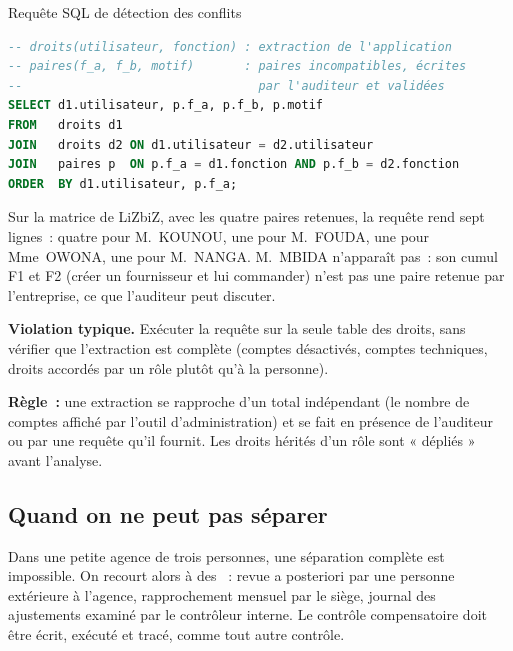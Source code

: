 \begin{boxoutils}{Requête SQL de détection des conflits}
\begin{lstlisting}[language=SQL]
-- droits(utilisateur, fonction) : extraction de l'application
-- paires(f_a, f_b, motif)       : paires incompatibles, écrites
--                                 par l'auditeur et validées
SELECT d1.utilisateur, p.f_a, p.f_b, p.motif
FROM   droits d1
JOIN   droits d2 ON d1.utilisateur = d2.utilisateur
JOIN   paires p  ON p.f_a = d1.fonction AND p.f_b = d2.fonction
ORDER  BY d1.utilisateur, p.f_a;
\end{lstlisting}
Sur la matrice de LiZbiZ, avec les quatre paires retenues, la requête rend
sept lignes~: quatre pour M.~KOUNOU, une pour M.~FOUDA, une pour
Mme~OWONA, une pour M.~NANGA. M.~MBIDA n'apparaît pas~: son cumul F1 et F2
(créer un fournisseur et lui commander) n'est pas une paire retenue par
l'entreprise, ce que l'auditeur peut discuter.
\end{boxoutils}

\begin{boxalert}
\textbf{Violation typique.} Exécuter la requête sur la seule table des
droits, sans vérifier que l'extraction est complète (comptes désactivés,
comptes techniques, droits accordés par un rôle plutôt qu'à la personne).

\smallskip
\textbf{Règle~:} une extraction se rapproche d'un total indépendant (le
nombre de comptes affiché par l'outil d'administration) et se fait en
présence de l'auditeur ou par une requête qu'il fournit. Les droits
hérités d'un rôle sont « dépliés » avant l'analyse.
\end{boxalert}

\subsection{Quand on ne peut pas séparer}

Dans une petite agence de trois personnes, une séparation complète est
impossible. On recourt alors à des ~: revue a posteriori par une
personne extérieure à l'agence, rapprochement mensuel par le siège, journal
des ajustements examiné par le contrôleur interne. Le contrôle compensatoire
doit être écrit, exécuté et tracé, comme tout autre contrôle.

